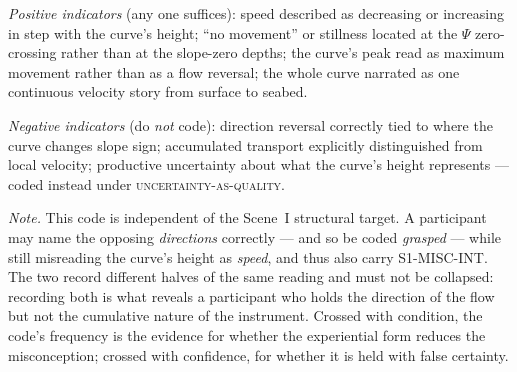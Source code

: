 \emph{Positive indicators} (any one suffices): speed described as decreasing or increasing in step with the curve's height; ``no movement'' or stillness located at the $\Psi$ zero-crossing rather than at the slope-zero depths; the curve's peak read as maximum movement rather than as a flow reversal; the whole curve narrated as one continuous velocity story from surface to seabed.

\emph{Negative indicators} (do \emph{not} code): direction reversal correctly tied to where the curve changes slope sign; accumulated transport explicitly distinguished from local velocity; productive uncertainty about what the curve's height represents --- coded instead under \textsc{uncertainty-as-quality}.

\emph{Note.} This code is independent of the Scene~I structural target. A participant may name the opposing \emph{directions} correctly --- and so be coded \emph{grasped} --- while still misreading the curve's height as \emph{speed}, and thus also carry S1-MISC-INT. The two record different halves of the same reading and must not be collapsed: recording both is what reveals a participant who holds the direction of the flow but not the cumulative nature of the instrument. Crossed with condition, the code's frequency is the evidence for whether the experiential form reduces the misconception; crossed with confidence, for whether it is held with false certainty.